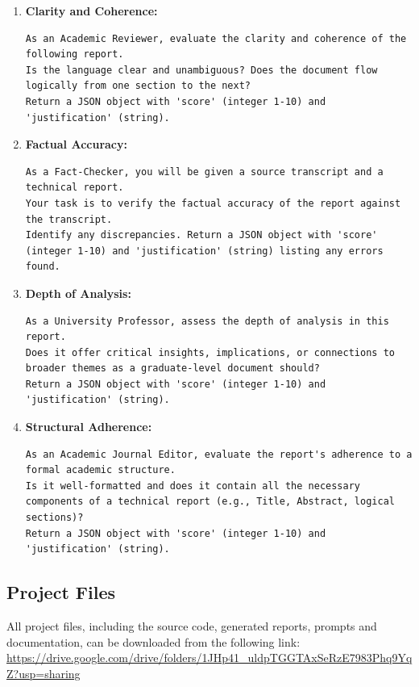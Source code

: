 \begin{enumerate}
    \item \textbf{Clarity and Coherence:}
    \begin{lstlisting}[breaklines=true, basicstyle=\ttfamily\small]
As an Academic Reviewer, evaluate the clarity and coherence of the following report. 
Is the language clear and unambiguous? Does the document flow logically from one section to the next? 
Return a JSON object with 'score' (integer 1-10) and 'justification' (string).
    \end{lstlisting}
    
    \item \textbf{Factual Accuracy:}
    \begin{lstlisting}[breaklines=true, basicstyle=\ttfamily\small]
As a Fact-Checker, you will be given a source transcript and a technical report. 
Your task is to verify the factual accuracy of the report against the transcript. 
Identify any discrepancies. Return a JSON object with 'score' (integer 1-10) and 'justification' (string) listing any errors found.
    \end{lstlisting}
    
    \item \textbf{Depth of Analysis:}
    \begin{lstlisting}[breaklines=true, basicstyle=\ttfamily\small]
As a University Professor, assess the depth of analysis in this report. 
Does it offer critical insights, implications, or connections to broader themes as a graduate-level document should? 
Return a JSON object with 'score' (integer 1-10) and 'justification' (string).
    \end{lstlisting}
    
    \item \textbf{Structural Adherence:}
    \begin{lstlisting}[breaklines=true, basicstyle=\ttfamily\small]
As an Academic Journal Editor, evaluate the report's adherence to a formal academic structure. 
Is it well-formatted and does it contain all the necessary components of a technical report (e.g., Title, Abstract, logical sections)? 
Return a JSON object with 'score' (integer 1-10) and 'justification' (string).
    \end{lstlisting}
\end{enumerate}

\subsection{Project Files}
All project files, including the source code, generated reports, prompts and documentation, can be downloaded from the following link: \url{https://drive.google.com/drive/folders/1JHp41_uldpTGGTAxSeRzE7983Phq9YqZ?usp=sharing}